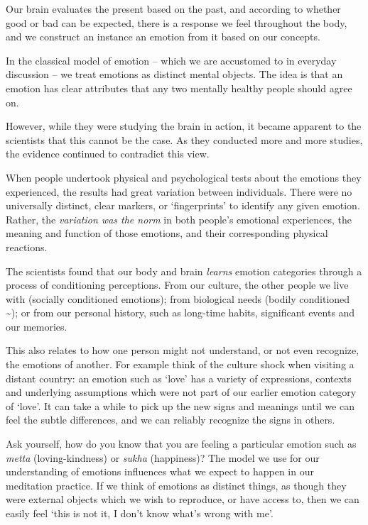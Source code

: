 Our brain evaluates the present based on the past, and according to
whether good or bad can be expected, there is a response we feel
throughout the body, and we construct an instance an emotion from it
based on our concepts.


In the classical model of emotion -- which we are accustomed to in
everyday discussion -- we treat emotions as distinct mental objects. The
idea is that an emotion has clear attributes that any two mentally
healthy people should agree on.

However, while they were studying the brain in action, it became
apparent to the scientists that this cannot be the case. As they
conducted more and more studies, the evidence continued to contradict
this view.

When people undertook physical and psychological tests about the
emotions they experienced, the results had great variation between
individuals. There were no universally distinct, clear markers, or
`fingerprints' to identify any given emotion. Rather, the
\emph{variation was the norm} in both people's emotional experiences,
the meaning and function of those emotions, and their corresponding
physical reactions.

The scientists found that our body and brain \emph{learns} emotion
categories through a process of conditioning perceptions. From our
culture, the other people we live with (socially conditioned emotions);
from biological needs (bodily conditioned \textasciitilde); or from our
personal history, such as long-time habits, significant events and our
memories.

This also relates to how one person might not understand, or not even
recognize, the emotions of another. For example think of the culture
shock when visiting a distant country: an emotion such as `love' has a
variety of expressions, contexts and underlying assumptions which were
not part of our earlier emotion category of `love'. It can take a while
to pick up the new signs and meanings until we can feel the subtle
differences, and we can reliably recognize the signs in others.

Ask yourself, how do you know that you are feeling a particular emotion
such as \emph{metta} (loving-kindness) or \emph{sukha} (happiness)? The
model we use for our understanding of emotions influences what we expect
to happen in our meditation practice. If we think of emotions as
distinct things, as though they were external objects which we wish to
reproduce, or have access to, then we can easily feel `this is not it, I
don't know what's wrong with me'.

